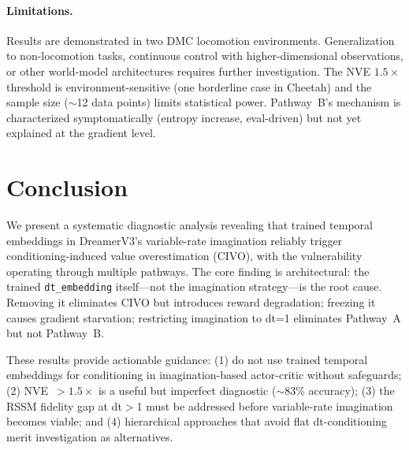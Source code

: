 \documentclass[10pt,letterpaper]{article}
\begin{document}
\paragraph{Limitations.}
Results are demonstrated in two DMC locomotion environments.
Generalization to non-locomotion tasks, continuous control with higher-dimensional observations, or other world-model architectures requires further investigation.
The NVE $1.5\times$ threshold is environment-sensitive (one borderline case in Cheetah) and the sample size ($\sim$12 data points) limits statistical power.
Pathway~B's mechanism is characterized symptomatically (entropy increase, eval-driven) but not yet explained at the gradient level.

\section{Conclusion}
\label{sec:conclusion}

We present a systematic diagnostic analysis revealing that trained temporal embeddings in DreamerV3's variable-rate imagination reliably trigger conditioning-induced value overestimation (CIVO), with the vulnerability operating through multiple pathways.
The core finding is architectural: the trained \texttt{dt\_embedding} itself---not the imagination strategy---is the root cause.
Removing it eliminates CIVO but introduces reward degradation; freezing it causes gradient starvation; restricting imagination to dt=1 eliminates Pathway~A but not Pathway~B.

These results provide actionable guidance: (1) do not use trained temporal embeddings for conditioning in imagination-based actor-critic without safeguards; (2) NVE~$>1.5\times$ is a useful but imperfect diagnostic ($\sim$83\% accuracy); (3) the RSSM fidelity gap at dt$>$1 must be addressed before variable-rate imagination becomes viable; and (4) hierarchical approaches that avoid flat dt-conditioning merit investigation as alternatives.
\end{document}
